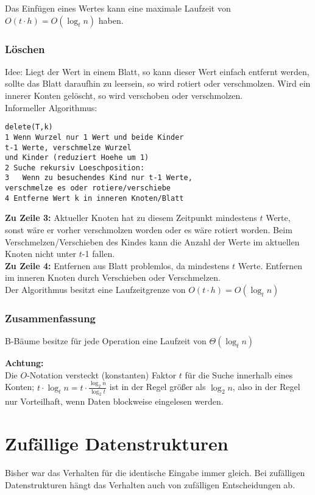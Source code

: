 \documentclass[jou,apacite]{apa6}
\begin{document}
Das Einfügen eines Wertes kann eine maximale Laufzeit von $O(t \cdot h) = O(\log_t n)$ haben.

\subsubsection{Löschen}
Idee: Liegt der Wert in einem Blatt, so kann dieser Wert einfach entfernt werden, sollte das Blatt daraufhin \dq zu leer\dq  sein, so wird rotiert oder verschmolzen. Wird ein innerer Konten gelöscht, so wird verschoben oder verschmolzen. \\
Informeller Algorithmus:
\begin{lstlisting}
delete(T,k)
1 Wenn Wurzel nur 1 Wert und beide Kinder
t-1 Werte, verschmelze Wurzel 
und Kinder (reduziert Hoehe um 1)
2 Suche rekursiv Loeschposition:
3   Wenn zu besuchendes Kind nur t-1 Werte,
verschmelze es oder rotiere/verschiebe
4 Entferne Wert k in inneren Knoten/Blatt
\end{lstlisting}
{\bfseries Zu Zeile 3:} Aktueller Knoten hat zu diesem Zeitpunkt mindestens $t$ Werte, sonst wäre
er vorher verschmolzen worden oder es wäre rotiert worden.
Beim Verschmelzen/Verschieben des Kindes kann die Anzahl der Werte
im aktuellen Knoten nicht unter $t$-1 fallen.\\
{\bfseries Zu Zeile 4:} Entfernen aus Blatt problemlos, da mindestens $t$ Werte.
Entfernen im inneren Knoten durch Verschieben oder Verschmelzen.\\
Der Algorithmus besitzt eine Laufzeitgrenze von $O(t \cdot h) = O(\log_t n)$

\subsubsection{Zusammenfassung}
B-Bäume besitze für jede Operation eine Laufzeit von $\Theta(\log_t n)$ 

{\bfseries Achtung:} \\
Die $O$-Notation versteckt (konstanten) Faktor $t$ für die Suche innerhalb eines Konten;
$t \cdot \log_t n = t \cdot \frac{\log_{2}n}{\log_{2}t} $ ist in der Regel größer als $\log_{2}n$, also in der Regel nur Vorteilhaft, wenn Daten blockweise eingelesen werden.

\section{Zufällige Datenstrukturen}
Bisher war das Verhalten für die identische Eingabe immer gleich. Bei zufälligen Datenstrukturen hängt das Verhalten auch von zufälligen Entscheidungen ab.
\end{document}

